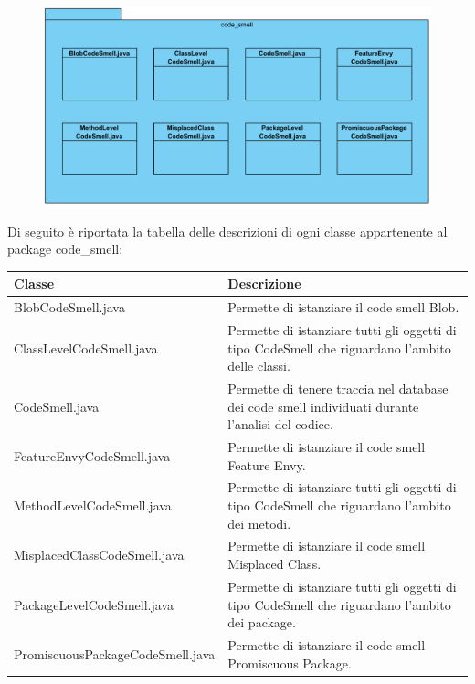 \documentclass[11pt]{article}
\begin{document}
			\begin{description}
				\item[2.1.1.1 Package code\_smell]
				\item \begin{figure}[!h]
					\centering
					\includegraphics[width=13cm]{diagrams/Code_SmellPackageDiagram}
				\end{figure}
				Di seguito è riportata la tabella delle descrizioni di ogni classe appartenente al package code\_smell:
				\item \begin{tabular}{|p{}|p{}|}
					\hline
					\textbf{Classe} & \textbf{Descrizione}\\
					\hline
					BlobCodeSmell.java & Permette di istanziare il code smell Blob. \\
					\hline
					ClassLevelCodeSmell.java & Permette di istanziare tutti gli oggetti di tipo CodeSmell che riguardano l'ambito delle classi. \\
					\hline
					CodeSmell.java & Permette di tenere traccia nel database dei code smell individuati durante l'analisi del codice.\\
					\hline
					FeatureEnvyCodeSmell.java & Permette di istanziare il code smell Feature Envy.\\
					\hline
					MethodLevelCodeSmell.java & Permette di istanziare tutti gli oggetti di tipo CodeSmell che riguardano l'ambito dei metodi.\\
					\hline
					MisplacedClassCodeSmell.java & Permette di istanziare il code smell Misplaced Class. \\
					\hline
					PackageLevelCodeSmell.java & Permette di istanziare tutti gli oggetti di tipo CodeSmell che riguardano l'ambito dei package.\\
					\hline
					PromiscuousPackageCodeSmell.java & Permette di istanziare il code smell Promiscuous Package.\\

\end{tabular}
\end{description}
\end{document}
